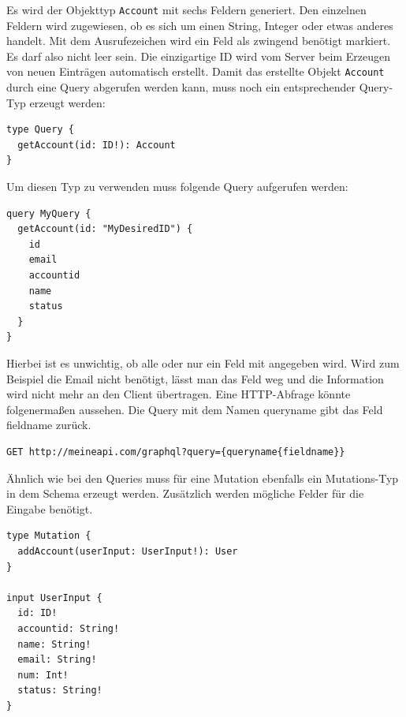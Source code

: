 Es wird der Objekttyp \verb+Account+ mit sechs Feldern generiert.
Den einzelnen Feldern wird zugewiesen, ob es sich um einen String, Integer oder etwas anderes handelt.
Mit dem Ausrufezeichen wird ein Feld als zwingend benötigt markiert.
Es darf also nicht leer sein. Die einzigartige ID wird vom Server beim Erzeugen von neuen Einträgen automatisch erstellt.
Damit das erstellte Objekt \verb+Account+ durch eine Query abgerufen werden kann, muss noch ein entsprechender Query-Typ erzeugt werden:

\begin{lstlisting}[basicstyle=\ttfamily, breaklines=true , frame = single, backgroundcolor=\color{flashwhite} ]
type Query {
  getAccount(id: ID!): Account
}

\end{lstlisting}

Um diesen Typ zu verwenden muss folgende Query aufgerufen werden:

\begin{lstlisting}[basicstyle=\ttfamily, breaklines=true , frame = single, backgroundcolor=\color{flashwhite} ]
query MyQuery {
  getAccount(id: "MyDesiredID") {
    id
    email
    accountid
    name
    status
  }
}

\end{lstlisting}

Hierbei ist es unwichtig, ob alle oder nur ein Feld mit angegeben wird.
Wird zum Beispiel die Email nicht benötigt, lässt man das Feld weg und die Information wird nicht mehr an den Client übertragen.\cite{GraphQL1}
Eine HTTP-Abfrage könnte folgenermaßen aussehen.
Die Query mit dem Namen \glqq queryname \grqq{} gibt das Feld \glqq fieldname \grqq{} zurück. \cite{GraphQLHTTP}

\begin{lstlisting}[basicstyle=\ttfamily, breaklines=true , frame = single, backgroundcolor=\color{flashwhite} ]
GET http://meineapi.com/graphql?query={queryname{fieldname}}

\end{lstlisting}

Ähnlich wie bei den Queries muss für eine Mutation ebenfalls ein Mutations-Typ in dem Schema erzeugt werden.
Zusätzlich werden mögliche Felder für die Eingabe benötigt.


\begin{lstlisting}[basicstyle=\ttfamily, breaklines=true , frame = single, backgroundcolor=\color{flashwhite} ]
type Mutation {
  addAccount(userInput: UserInput!): User
}

input UserInput {
  id: ID!
  accountid: String!
  name: String!
  email: String!
  num: Int!
  status: String!
}
\end{lstlisting}

